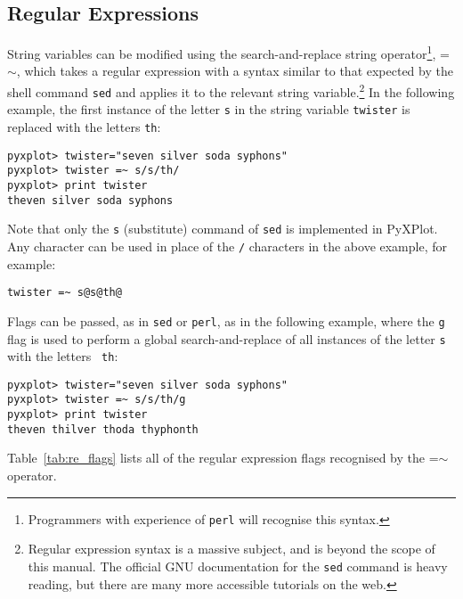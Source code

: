 \subsection{Regular Expressions}

String variables can be modified using the search-and-replace string
operator\footnote{Programmers with
experience of {\tt perl} will recognise this syntax.}, =$\sim$, which takes a regular expression with a syntax similar to that
expected by the shell command {\tt sed} and applies it to the relevant string variable.\footnote{Regular
expression syntax is a massive subject, and is beyond the scope of this manual.
The official GNU documentation for the {\tt sed} command is heavy reading, but
there are many more accessible tutorials on the web.} In the following example, the first instance of the letter {\tt s} in
the string variable {\tt twister} is replaced with the letters {\tt th}:

\begin{verbatim}
pyxplot> twister="seven silver soda syphons"
pyxplot> twister =~ s/s/th/
pyxplot> print twister
theven silver soda syphons
\end{verbatim}

Note that only the {\tt s} (substitute) command of {\tt sed} is implemented in
PyXPlot. Any character can be used in place of the {\tt /} characters in the
above example, for example:

\begin{verbatim}
twister =~ s@s@th@
\end{verbatim}

\noindent Flags can be passed, as in {\tt sed} or {\tt perl}, as in the
following example, where the {\tt g} flag is used to perform a global
search-and-replace of all instances of the letter {\tt s} with the letters {\tt
th}:

\begin{verbatim}
pyxplot> twister="seven silver soda syphons"
pyxplot> twister =~ s/s/th/g
pyxplot> print twister
theven thilver thoda thyphonth
\end{verbatim}

\noindent Table~\ref{tab:re_flags} lists all of the regular expression flags
recognised by the =$\sim$ operator.

